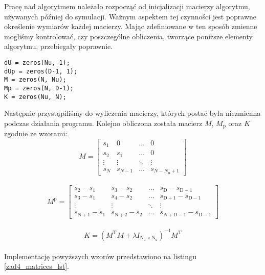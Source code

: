 Pracę nad algorytmem należało rozpocząć od inicjalizacji macierzy algorytmu, używanych później do symulacji. Ważnym aspektem tej czynności jest poprawne określenie wymiarów każdej macierzy. Mając zdefiniowane w ten sposób zmienne mogliśmy kontrolować, czy poszczególne obliczenia, tworzące poniższe elementy algorytmu, przebiegały poprawnie.
\\

\begin{lstlisting}[style=custommatlab,frame=single,label={zad4_sim_lst},caption={Definicja macierzy algorytmu DMC},captionpos=b]
dU = zeros(Nu, 1);
dUp = zeros(D-1, 1);
M = zeros(N, Nu);
Mp = zeros(N, D-1);
K = zeros(Nu, N);
\end{lstlisting}

Następnie przystąpiliśmy do wyliczenia macierzy, których postać była niezmienna podczas działania programu. Kolejno obliczona została macierz $M$, $M_\mathrm{p}$ oraz $K$ zgodnie ze wzorami:
\\

\begin{equation}
M=\left[
\begin{array}
{cccc}
s_{1} & 0 & \ldots & 0\\
s_{2} & s_{1} & \ldots & 0\\
\vdots & \vdots & \ddots & \vdots\\
s_{N} & s_{N-1} & \ldots &  s_{N-N_{\mathrm{u}}+1}
\end{array}
\right]
\end{equation}
\\
\begin{equation}
M^{\mathrm{p}}=\left[
\begin{array}
{cccc}
s_{\mathrm{2}} - s_{\mathrm{1}} & s_{\mathrm{3}} - s_{\mathrm{2}} & \ldots & s_{\mathrm{D}} - s_{\mathrm{D-1}}\\
s_{\mathrm{3}} - s_{\mathrm{1}} & s_{\mathrm{4}} - s_{\mathrm{2}} & \ldots & s_{\mathrm{D+1}} - s_{\mathrm{D-1}}\\
\vdots & \vdots & \ddots & \vdots\\
s_{\mathrm{N+1}} - s_{1} & s_{\mathrm{N+2}} - s_{\mathrm{2}} & \ldots &  s_{N + \mathrm{D} - 1} - s_{{\mathrm{D-1}}}
\end{array}
\right]
\end{equation}
\\
\begin{equation}
K = (M^{\mathrm{T}} M + \lambda I_{\mathrm{N_{\mathrm{u}}} \times \mathrm{N_{\mathrm{u}}}})^{\mathrm{-1}} M^{\mathrm{T}}
\end{equation}
\\
Implementację powyższych wzorów przedstawiono na listingu \ref{zad4_matrices_lst}.\\


